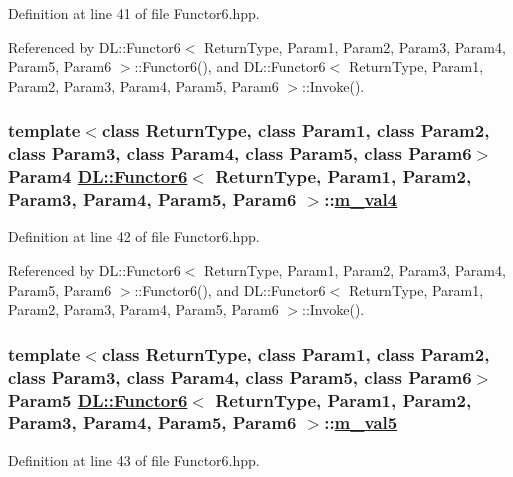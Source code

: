 Definition at line 41 of file Functor6.hpp.

Referenced by DL::Functor6$<$ Return\-Type, Param1, Param2, Param3, Param4, Param5, Param6 $>$::Functor6(), and DL::Functor6$<$ Return\-Type, Param1, Param2, Param3, Param4, Param5, Param6 $>$::Invoke().\hypertarget{classDL_1_1Functor6_r4}{
\subsubsection[m\_\-val4]{\setlength{\rightskip}{0pt plus 5cm}template$<$class Return\-Type, class Param1, class Param2, class Param3, class Param4, class Param5, class Param6$>$ Param4 \hyperlink{classDL_1_1Functor6}{DL::Functor6}$<$ Return\-Type, Param1, Param2, Param3, Param4, Param5, Param6 $>$::\hyperlink{classDL_1_1Functor6_r4}{m\_\-val4}}}
\label{classDL_1_1Functor6_r4}




Definition at line 42 of file Functor6.hpp.

Referenced by DL::Functor6$<$ Return\-Type, Param1, Param2, Param3, Param4, Param5, Param6 $>$::Functor6(), and DL::Functor6$<$ Return\-Type, Param1, Param2, Param3, Param4, Param5, Param6 $>$::Invoke().\hypertarget{classDL_1_1Functor6_r5}{
\subsubsection[m\_\-val5]{\setlength{\rightskip}{0pt plus 5cm}template$<$class Return\-Type, class Param1, class Param2, class Param3, class Param4, class Param5, class Param6$>$ Param5 \hyperlink{classDL_1_1Functor6}{DL::Functor6}$<$ Return\-Type, Param1, Param2, Param3, Param4, Param5, Param6 $>$::\hyperlink{classDL_1_1Functor6_r5}{m\_\-val5}}}
\label{classDL_1_1Functor6_r5}




Definition at line 43 of file Functor6.hpp.

